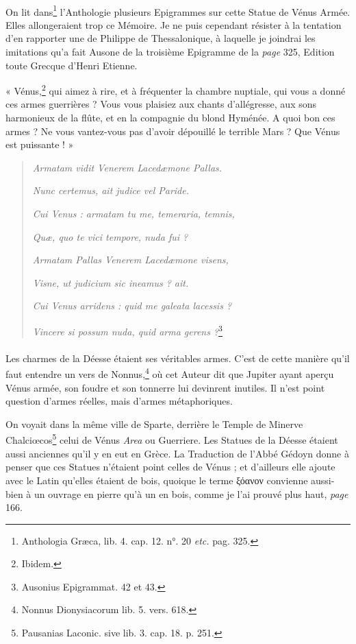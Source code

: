 \documentclass[a4paper, 11pt, oneside, polutonikogreek, french]{article}
\begin{document}
\paragraph{}
On lit dans\footnote{Anthologia Græca, lib. 4. cap. 12. n°. 20 \emph{etc.} pag. 325.} l'Anthologie plusieurs Epigrammes sur cette Statue de Vénus Armée. Elles allongeraient trop ce Mémoire. Je ne puis cependant résister à la tentation d'en rapporter une de Philippe de Thessalonique, à laquelle je joindrai les imitations qu'a fait Ausone de la troisième Epigramme de la \emph{page} 325, Edition toute Grecque d'Henri Etienne.

« Vénus,\footnote{Ibidem.} qui aimez à rire, et à fréquenter la chambre nuptiale, qui vous a donné ces armes guerrières ? Vous vous plaisiez aux chants d'allégresse, aux sons harmonieux de la flûte, et en la compagnie du blond Hyménée. A quoi bon ces armes ? Ne vous vantez-vous pas d'avoir dépouillé le terrible Mars ? Que Vénus est puissante ! »
\begin{quotation}
\emph{Armatam vidit Venerem Lacedæmone Pallas.}

\hspace*{5mm}\emph{Nunc certemus, ait judice vel Paride.}

\emph{Cui Venus : armatam tu me, temeraria, temnis,}

\hspace*{5mm}\emph{Quæ, quo te vici tempore, nuda fui ?}

\emph{Armatam Pallas Venerem Lacedæmone visens,}

\hspace*{5mm}\emph{Visne, ut judicium sic ineamus ? ait.}

\emph{Cui Venus arridens : quid me galeata lacessis ?}

\hspace*{5mm}\emph{Vincere si possum nuda, quid arma gerens ?}\footnote{Ausonius Epigrammat. 42 et 43.}
\end{quotation}
\paragraph{}
Les charmes de la Déesse étaient ses véritables armes. C'est de cette manière qu'il faut entendre un vers de Nonnus,\footnote{Nonnus Dionysiacorum lib. 5. vers. 618.} où cet Auteur dit que Jupiter ayant aperçu Vénus armée, son foudre et son tonnerre lui devinrent inutiles. Il n'est point question d'armes réelles, mais d'armes métaphoriques.

On voyait dans la même ville de Sparte, derrière le Temple de Minerve Chalciœcos\footnote{Pausanias Laconic. sive lib. 3. cap. 18. p. 251.} celui de Vénus \emph{Area} ou Guerriere. Les Statues de la Déesse étaient aussi anciennes qu'il y en eut en Grèce. La Traduction de l'Abbé Gédoyn donne à penser que ces Statues n'étaient point celles de Vénus ; et d'ailleurs elle ajoute avec le Latin qu'elles étaient de bois, quoique le terme ξόανον convienne aussi-bien à un ouvrage en pierre qu'à un en bois, comme je l'ai prouvé plus haut, \emph{page} 166.
\end{document}
